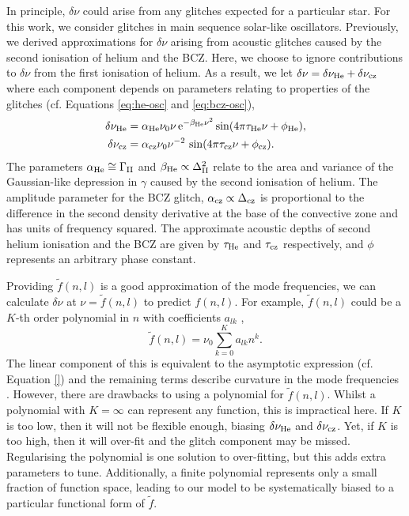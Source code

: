 In principle, \(\delta\nu\) could arise from any glitches expected for a particular star. For this work, we consider glitches in main sequence solar-like oscillators. Previously, we derived approximations for \(\delta\nu\) arising from acoustic glitches caused by the second ionisation of helium and the BCZ. Here, we choose to ignore contributions to \(\delta\nu\) from the first ionisation of helium. As a result, we let \(\delta\nu = \delta\nu_{{\mathrm{He}}} + \delta\nu_{{\mathrm{cz}}}\) where each component depends on parameters relating to properties of the glitches (cf. Equations \ref{eq:he-osc} and \ref{eq:bcz-osc}),
%
\begin{align}
    \delta\nu_{{\mathrm{He}}} &= \alpha_{{\mathrm{He}}} \nu_0 \nu \, \mathrm{e}^{-\beta_{{\mathrm{He}}} \nu^2} \sin(4\pi\tau_{{\mathrm{He}}}\nu + \phi_{{\mathrm{He}}}), \label{eq:he-glitch}\\
    \delta\nu_{{\mathrm{cz}}} &= \alpha_{{\mathrm{cz}}} \nu_0 \nu^{-2} \, \sin(4\pi\tau_{{\mathrm{cz}}}\nu + \phi_{{\mathrm{cz}}}). \label{eq:bcz-glitch}
\end{align}
%
The parameters \(\alpha_{{\mathrm{He}}} \cong \Gamma_{{\mathrm{II}}}\) and \(\beta_{{\mathrm{He}}} \propto \Delta_{{\mathrm{II}}}^2\) relate to the area and variance of the Gaussian-like depression in \(\gamma\) caused by the second ionisation of helium. The amplitude parameter for the BCZ glitch, \(\alpha_{{\mathrm{cz}}} \propto \Delta_{{\mathrm{cz}}}\) is proportional to the difference in the second density derivative at the base of the convective zone and has units of frequency squared. The approximate acoustic depths of second helium ionisation and the BCZ are given by \(\tau_{{\mathrm{He}}}\) and \(\tau_{{\mathrm{cz}}}\) respectively, and \(\phi\) represents an arbitrary phase constant.

Providing \(\tilde{f}(n, l)\) is a good approximation of the mode frequencies, we can calculate \(\delta\nu\) at \(\nu = \tilde{f}(n, l)\) to predict \(f(n, l)\). For example, \(\tilde{f}(n,l)\) could be a \(K\)-th order polynomial in \(n\) with coefficients \(a_{lk}\) \citep[e.g.][]{Kjeldsen.Bedding.ea2005,Ulrich1986},
%
\begin{equation}
    \tilde{f}(n, l) = \nu_0 \sum_{k=0}^{K} a_{lk} n^k. \label{eq:poly}
\end{equation}
%
The linear component of this is equivalent to the asymptotic expression (cf. Equation \ref{}) and the remaining terms describe curvature in the mode frequencies . However, there are drawbacks to using a polynomial for \(\tilde{f}(n, l)\). Whilst a polynomial with \(K = \infty\) can represent any function, this is impractical here. If \(K\) is too low, then it will not be flexible enough, biasing \(\delta\nu_{{\mathrm{He}}}\) and \(\delta\nu_{{\mathrm{cz}}}\). Yet, if \(K\) is too high, then it will over-fit and the glitch component may be missed. Regularising the polynomial is one solution to over-fitting, but this adds extra parameters to tune. Additionally, a finite polynomial represents only a small fraction of function space, leading to our model to be systematically biased to a particular functional form of \(\tilde{f}\).

